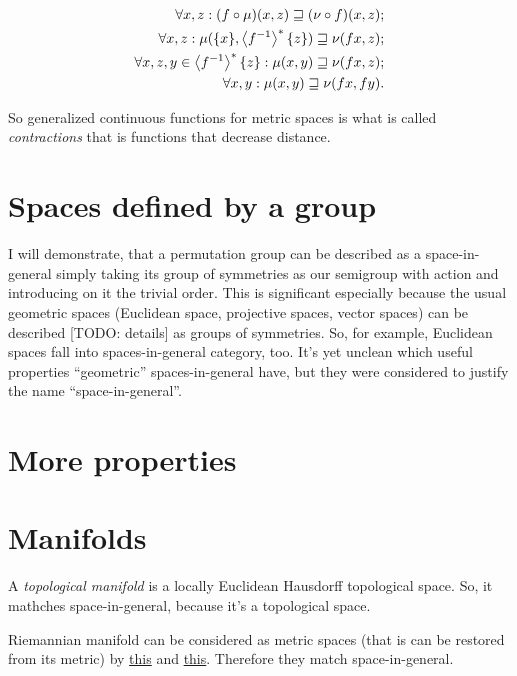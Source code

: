 \begin{align*}
\forall x,z: (f\circ\mu)(x,z)\sqsupseteq(\nu\circ f)(x,z);\\
\forall x,z: \mu(\{x\},\left\langle f^{-1}\right\rangle ^{\ast}\{z\})\sqsupseteq\nu(fx,z);\\
\forall x,z,y\in\left\langle f^{-1}\right\rangle ^{\ast}\{z\}: \mu(x,y)\sqsupseteq\nu(fx,z);\\
\forall x,y: \mu(x,y)\sqsupseteq\nu(fx,fy).
\end{align*}

So generalized continuous functions for metric spaces is what is called \emph{contractions} that is functions that decrease distance.

\chapter{Spaces defined by a group}

I will demonstrate, that a permutation group can be described as a space-in-general
simply taking its group of symmetries as our semigroup with action and introducing on it the trivial order.
This is significant especially because the usual geometric spaces (Euclidean space, projective spaces, vector spaces)
can be described [TODO: details] as groups of symmetries. So, for example, Euclidean spaces fall into spaces-in-general category, too.
It's yet unclean which useful properties ``geometric'' spaces-in-general have, but they were considered to justify the name ``space-in-general''.

\chapter{More properties}


\chapter{Manifolds}

A \emph{topological manifold} is a locally Euclidean Hausdorff topological space. So, it mathches space-in-general, because it's a topological space.

Riemannian manifold can be considered as metric spaces (that is can be restored from its metric) by
\href{https://mathoverflow.net/q/45154/4086}{this} and \href{https://math.stackexchange.com/q/4962648/4876}{this}.
Therefore they match space-in-general.


